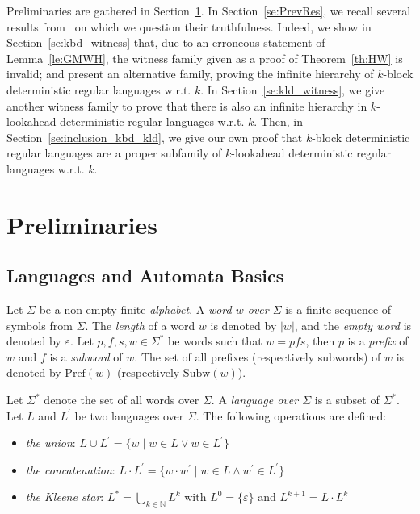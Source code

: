 \documentclass{llncs}
\begin{document}
	Preliminaries are gathered in Section~\ref{se:pre}.
	In Section~\ref{se:PrevRes}, we recall several results from~\cite{GMW01,HW08} on which we question their truthfulness.
	Indeed, we show in Section~\ref{se:kbd_witness} that, due to an erroneous statement of Lemma~\ref{le:GMWH}, the witness family given as a proof of Theorem~\ref{th:HW} is invalid; and present an alternative family, proving the infinite hierarchy of $k$-block deterministic regular languages w.r.t. $k$.
	In Section~\ref{se:kld_witness}, we give another witness family to prove that there is also an infinite hierarchy in $k$-lookahead deterministic regular languages w.r.t. $k$.
	Then, in Section~\ref{se:inclusion_kbd_kld}, we give our own proof that $k$-block deterministic regular languages are a proper subfamily of $k$-lookahead deterministic regular languages w.r.t. $k$.


\section{Preliminaries}\label{se:pre}

\subsection{Languages and Automata Basics}
	Let $\Sigma$ be a non-empty finite \emph{alphabet}.
A \emph{word $w$ over $\Sigma$} is a finite sequence of symbols from $\Sigma$.
The \emph{length} of a word $w$ is denoted by $|w|$, and the \emph{empty word} is denoted by $\varepsilon$.
Let $p, f, s, w \in \Sigma^*$ be words such that $w = pfs$, then $p$ is a \emph{prefix} of $w$ and $f$ is a \emph{subword} of $w$.
The set of all prefixes (respectively subwords) of $w$ is denoted by $\mathrm{Pref}(w)$ (respectively $\mathrm{Subw}(w)$).

	Let $\Sigma^*$ denote the set of all words over $\Sigma$.
A \emph{language over $\Sigma$} is a subset of $\Sigma^*$.
Let $L$ and $L^{\prime}$ be two languages over $\Sigma$. The following operations are defined:
\begin{itemize}
	\item \emph{the union}: $L \cup L^{\prime} = \{w \mid w \in L \vee w \in L^{\prime}\}$
	\item \emph{the concatenation}: $L \cdot L^{\prime} = \{w \cdot w^{\prime} \mid w \in L \wedge w^{\prime} \in L^{\prime}\}$
	\item \emph{the Kleene star}: $L^* = \bigcup_{k \in \mathbb{N}} L^k$ with $L^0 = \{\varepsilon\}$ and $L^{k+1} = L \cdot L^k$
\end{itemize}
\end{document}
